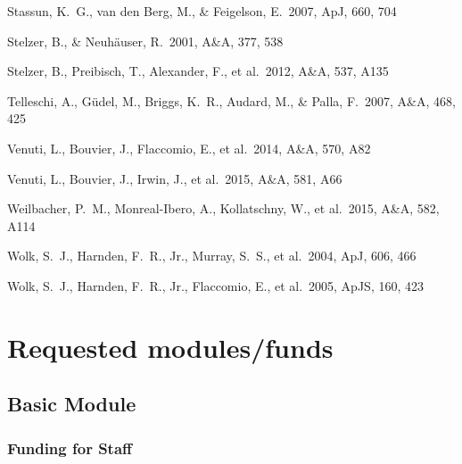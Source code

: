 \documentclass[10pt,fleqn,twoside]{article}
\newcommand*\aap{A\&A}
\newcommand*\apj{ApJ}
\newcommand*\apjs{ApJS}
\begin{document}
\begin{thebibliography}{}
 Stassun, K.~G., van den Berg, M., \& Feigelson, E.\ 2007, \apj, 660, 704 

 Stelzer, B., \& Neuh{\"a}user, R.\ 2001, \aap, 377, 538

 Stelzer, B., Preibisch, T., Alexander, F., et al.\ 2012, \aap, 537, A135

 Telleschi, A., G{\"u}del, M., Briggs, K.~R., Audard, M., \& Palla, F.\ 2007, \aap, 468, 425 

 Venuti, L., Bouvier, J., Flaccomio, E., et al.\ 2014, \aap, 570, A82 

 Venuti, L., Bouvier, J., Irwin, J., et al.\ 2015, \aap, 581, A66 

 Weilbacher, P.~M., Monreal-Ibero, A., Kollatschny, W., et al.\ 2015, \aap, 582, A114 

 Wolk, S.~J., Harnden, F.~R., Jr., Murray, S.~S., et al.\ 2004, \apj, 606, 466

 Wolk, S.~J., Harnden, F.~R., Jr., Flaccomio, E., et al.\ 2005, \apjs, 160, 423 
\end{thebibliography}
\endgroup




\section{Requested modules/funds}
\renewcommand{\leftmark}{\sc  Requested modules/funds}

\subsection{Basic Module}

\subsubsection{Funding for Staff}
\end{document}
